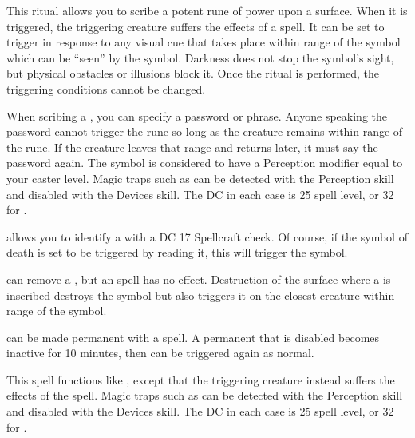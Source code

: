 \spelleffect This ritual allows you to scribe a potent rune of power upon a surface. When it is triggered, the triggering creature suffers the effects of a  spell. It can be set to trigger in response to any visual cue that takes place within \rngclose range of the symbol which can be ``seen'' by the symbol. Darkness does not stop the symbol's sight, but physical obstacles or illusions block it. Once the ritual is performed, the triggering conditions cannot be changed.
\par When scribing a , you can specify a password or phrase. Anyone speaking the password cannot trigger the rune so long as the creature remains within \rngmed range of the rune. If the creature leaves that range and returns later, it must say the password again.
\spellnotes The symbol is considered to have a Perception modifier equal to your caster level. Magic traps such as  can be detected with the Perception skill and disabled with the Devices skill. The DC in each case is 25 \add spell level, or 32 for .
\par {} allows you to identify a  with a DC 17 Spellcraft check. Of course, if the symbol of death is set to be triggered by reading it, this will trigger the symbol.
\par {} can remove a , but an  spell has no effect. Destruction of the surface where a  is inscribed destroys the symbol but also triggers it on the closest creature within \rngclose range of the symbol.
\par {} can be made permanent with a  spell. A permanent  that is disabled becomes inactive for 10 minutes, then can be triggered again as normal.

\spelleffect This spell functions like , except that the triggering creature instead suffers the effects of the  spell.
\spellnotes Magic traps such as  can be detected with the Perception skill and disabled with the Devices skill. The DC in each case is 25 \add spell level, or 32 for .

